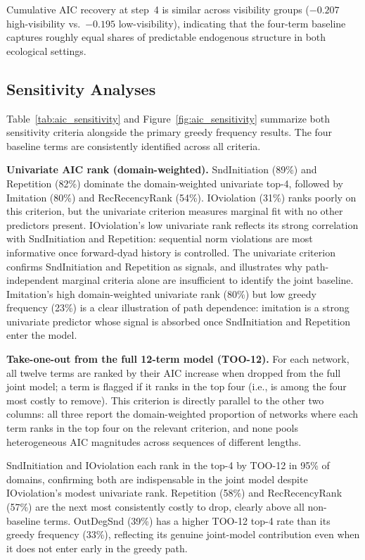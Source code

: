 \documentclass[11pt]{article}
\begin{document}
Cumulative AIC recovery at step~4 is similar across visibility groups
($-0.207$ high-visibility vs.\ $-0.195$ low-visibility), indicating that
the four-term baseline captures roughly equal shares of predictable endogenous
structure in both ecological settings.


\subsection{Sensitivity Analyses}

Table~\ref{tab:aic_sensitivity} and Figure~\ref{fig:aic_sensitivity} summarize
both sensitivity criteria alongside the primary greedy frequency results.
The four baseline terms are consistently identified across all criteria.

\textbf{Univariate AIC rank (domain-weighted).}
SndInitiation (89\%) and Repetition (82\%) dominate the domain-weighted
univariate top-4, followed by Imitation (80\%) and RecRecencyRank (54\%).
IOviolation (31\%) ranks poorly on this criterion,
but the univariate criterion measures marginal fit with no other predictors
present. IOviolation's low univariate rank reflects its strong correlation with
SndInitiation and Repetition: sequential norm violations are most informative
once forward-dyad history is controlled. The univariate criterion confirms
SndInitiation and Repetition as signals, and illustrates why
path-independent marginal criteria alone are insufficient to identify the joint baseline.
Imitation's high domain-weighted univariate rank (80\%) but low greedy frequency
(23\%) is a clear illustration of path dependence: imitation is a strong
univariate predictor whose signal is absorbed once SndInitiation and Repetition
enter the model.

\textbf{Take-one-out from the full 12-term model (TOO-12).}
For each network, all twelve terms are ranked by their AIC increase when
dropped from the full joint model; a term is flagged if it ranks in the
top four (i.e., is among the four most costly to remove). This criterion
is directly parallel to the other two columns: all three report the
domain-weighted proportion of networks where each term ranks in the top four
on the relevant criterion, and none pools heterogeneous AIC magnitudes across
sequences of different lengths.

SndInitiation and IOviolation each rank in the top-4 by TOO-12 in 95\% of
domains, confirming both are indispensable in the joint model despite
IOviolation's modest univariate rank. Repetition (58\%) and RecRecencyRank
(57\%) are the next most consistently costly to drop, clearly above all
non-baseline terms. OutDegSnd (39\%) has a higher TOO-12 top-4 rate than its
greedy frequency (33\%), reflecting its genuine joint-model contribution even
when it does not enter early in the greedy path.
\end{document}
